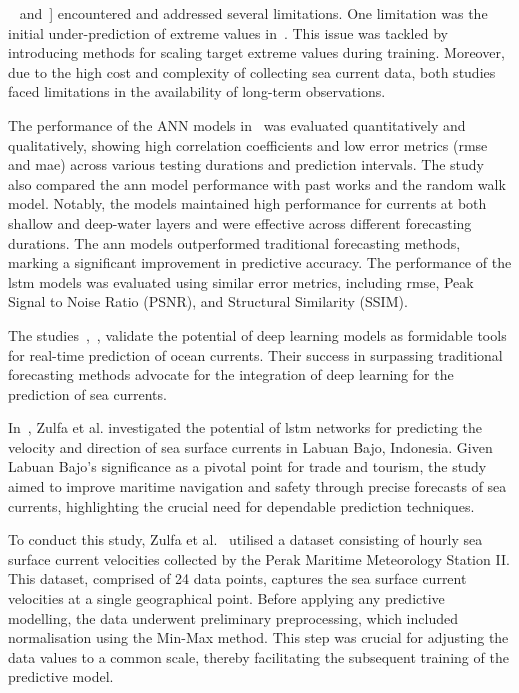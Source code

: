 ~\cite{41} and~\cite{42}] encountered and addressed several limitations. One limitation was the initial under-prediction of extreme values in~\cite{41}. This issue was tackled by introducing methods for scaling target extreme values during training. Moreover, due to the high cost and complexity of collecting sea current data, both studies faced limitations in the availability of long-term observations.

The performance of the ANN models in~\cite{41} was evaluated quantitatively and qualitatively, showing high correlation coefficients and low error metrics (\acrshort{rmse} and \acrshort{mae}) across various testing durations and prediction intervals. The study also compared the \acrshort{ann} model performance with past works and the random walk model. Notably, the models maintained high performance for currents at both shallow and deep-water layers and were effective across different forecasting durations. The \acrshort{ann} models outperformed traditional forecasting methods, marking a significant improvement in predictive accuracy. The performance of the \acrshort{lstm} models was evaluated using similar error metrics, including \acrshort{rmse}, Peak Signal to Noise Ratio (PSNR), and Structural Similarity (SSIM). 

The studies~\cite{41},~\cite{42}, validate the potential of deep learning models as formidable tools for real-time prediction of ocean currents. Their success in surpassing traditional forecasting methods advocate for the integration of deep learning for the prediction of sea currents.\newline

In~\cite{43}, Zulfa et al. investigated the potential of \acrshort{lstm} networks for predicting the velocity and direction of sea surface currents in Labuan Bajo, Indonesia. Given Labuan Bajo's significance as a pivotal point for trade and tourism, the study aimed to improve maritime navigation and safety through precise forecasts of sea currents, highlighting the crucial need for dependable prediction techniques.

To conduct this study, Zulfa et al.~\cite{43} utilised a dataset consisting of hourly sea surface current velocities collected by the Perak Maritime Meteorology Station II. This dataset, comprised of 24 data points, captures the sea surface current velocities at a single geographical point. Before applying any predictive modelling, the data underwent preliminary preprocessing, which included normalisation using the Min-Max method. This step was crucial for adjusting the data values to a common scale, thereby facilitating the subsequent training of the predictive model.

